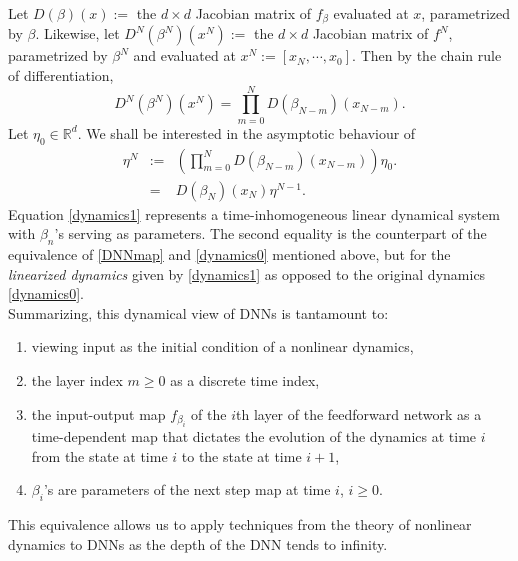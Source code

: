 \documentclass[12pt]{amsart}
\theoremstyle{plain}
\theoremstyle{definition}
\theoremstyle{remark}
\newcommand{\R}{\mathbb{R}}
\newcommand{\0}{\textbf{0}}
\begin{document}
Let  $D(\beta)(x) :=$  the $d\times d$ Jacobian matrix of $f_\beta$ evaluated at $x$, parametrized by $\beta$. Likewise, let $D^N(\beta^N)(x^N):=$  the $d\times d$ Jacobian matrix of  $f^N$, parametrized by $\beta^N$ and evaluated at $x^N := [x_N, \cdots , x_0]$. Then by the chain rule of differentiation,
\begin{equation}
D^N(\beta^N)(x^N) = \prod_{m=0}^{N}D(\beta_{N-m})(x_{N-m}). \label{chainrule}
\end{equation}
Let $\eta_0\in \R^d$. We shall be interested in the asymptotic behaviour of 
\begin{eqnarray}
\eta^N &:=& \left(\prod_{m=0}^{N}D(\beta_{N-m})(x_{N-m})\right)\eta_0. \label{mult} \\
&=& D(\beta_N)(x_N)\eta^{N-1}. \label{dynamics1}
\end{eqnarray}
Equation \eqref{dynamics1} represents a time-inhomogeneous linear dynamical system with $\beta_n$'s serving as parameters. The second equality is the counterpart of the equivalence of  \eqref{DNNmap} and \eqref{dynamics0} mentioned above, but for the \textit{linearized dynamics} given by \eqref{dynamics1} as opposed to the original dynamics \eqref{dynamics0}.\\

Summarizing, this dynamical view of DNNs is tantamount to:\\

\begin{enumerate}
\item viewing input as the initial condition of a nonlinear dynamics,\\

\item the layer index $m \geq 0$ as a discrete time index,\\

\item the input-output map $f_{\beta_i}$ of the $i$th layer of the feedforward network as a time-dependent map that dictates the evolution of the dynamics at time $i$ from the state at time $i$ to the state at time $i+1$,\\

\item $\beta_i$'s are parameters of the next step map at time $i$, $i \geq 0$. 
 
 \end{enumerate}
 
 \medskip
 
 This equivalence allows us to apply techniques from the theory of nonlinear dynamics to DNNs as the depth of the DNN tends to infinity.\\
 
\end{document}
